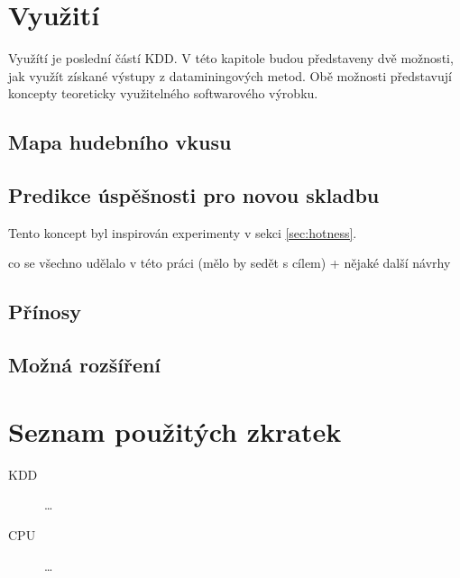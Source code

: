 \documentclass[thesis=M,czech]{FITthesis}[2012/06/26]
\begin{document}
\chapter{Využití}

Využítí je poslední částí KDD. V této kapitole budou představeny dvě možnosti, jak využít získané výstupy z dataminingových metod. Obě možnosti představují koncepty teoreticky využitelného softwarového výrobku.


\section{Mapa hudebního vkusu}


\section{Predikce úspěšnosti pro novou skladbu}
Tento koncept byl inspirován experimenty v sekci \ref{sec:hotness}. 



\begin{conclusion}
	co se všechno udělalo v této práci (mělo by sedět s cílem)
	+ nějaké další návrhy
	
	\section{Přínosy}
	
	\section{Možná rozšíření}
\end{conclusion}




\appendix

\chapter{Seznam použitých zkratek}
\begin{description}
	\item[KDD] \dots
	\item[CPU] \dots
\end{description}
\end{document}
